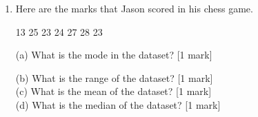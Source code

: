 \documentclass{article}
\begin{document}
\begin{enumerate}
\newpage
\begin{flushleft}
 (b) How long did she take? \hspace{2cm} [1 mark] \\
 \vspace{50pt}
 (c) If she wanted to leave earlier, which bus(es) would she take? \hspace{2cm} [1 mark] \\  
 \vspace{50pt}
 (d) If she wanted to arrive at the latest time, which bus would she take? \hspace{2cm} [1 mark] \\
 \vspace{50pt}
 \end{flushleft}

\vspace{10pt}
\hline
\vspace{5pt}

\item \quad Here are the marks that Jason scored in his chess game. \\
\begin{center}
13 \hspace{1cm} 25 \hspace{1cm}  23 \hspace{1cm}  24 \hspace{1cm}  27 \hspace{1cm}  28 \hspace{1cm}  23 \hspace{1cm}     
\end{center}

\begin{flushleft}
(a) What is the mode in the dataset? \hspace{2cm} [1 mark] \\
\vspace{50pt}

(b) What is the range of the dataset? \hspace{2cm} [1 mark] \\
\vspace{50pt}
(c) What is the mean of the dataset? \hspace{2cm} [1 mark] \\
\vspace{50pt}
(d) What is the median of the dataset? \hspace{2cm} [1 mark] \\
\vspace{50pt}
\end{flushleft}


\end{enumerate}
\end{document}
